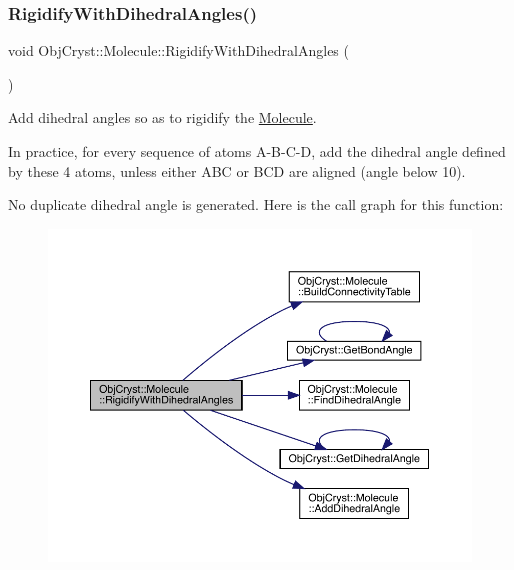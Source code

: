 \subsubsection{\texorpdfstring{RigidifyWithDihedralAngles()}{RigidifyWithDihedralAngles()}}
{\footnotesize\ttfamily void Obj\+Cryst\+::\+Molecule\+::\+Rigidify\+With\+Dihedral\+Angles (\begin{DoxyParamCaption}{ }\end{DoxyParamCaption})}

Add dihedral angles so as to rigidify the \mbox{\hyperlink{class_obj_cryst_1_1_molecule}{Molecule}}.

In practice, for every sequence of atoms A-\/\+B-\/\+C-\/D, add the dihedral angle defined by these 4 atoms, unless either A\+BC or B\+CD are aligned (angle below 10{\ucr}).

No duplicate dihedral angle is generated. Here is the call graph for this function\+:
\nopagebreak
\begin{figure}[H]
\begin{center}
\leavevmode
\includegraphics[width=350pt]{class_obj_cryst_1_1_molecule_a560c9ffc36d4874b99eb26c198ee485f_cgraph}
\end{center}
\end{figure}
\mbox{\label{class_obj_cryst_1_1_molecule_a9bd595a0ad88d6832718f3bffb452866}} 
